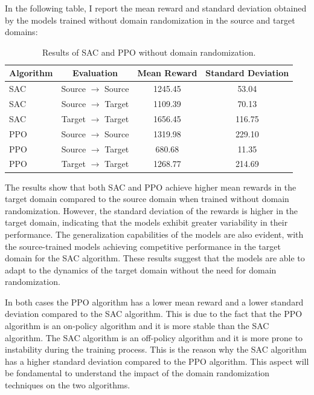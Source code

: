 \documentclass[11pt]{article}
\begin{document}
In the following table, I report the mean reward and standard deviation obtained by the models trained without domain randomization in the source and target domains:

\begin{table}[H]
    \centering
    \begin{tabular}{|l|c|c|c|}
        \hline
        \textbf{Algorithm} & \textbf{Evaluation} & \textbf{Mean Reward} & \textbf{Standard Deviation} \\ \hline
        SAC & Source $\rightarrow$ Source & 1245.45 & 53.04 \\ 
        SAC & Source $\rightarrow$ Target & 1109.39 & 70.13 \\ 
        SAC & Target $\rightarrow$ Target & 1656.45 & 116.75 \\ \hline
        PPO & Source $\rightarrow$ Source & 1319.98 & 229.10 \\ 
        PPO & Source $\rightarrow$ Target & 680.68 & 11.35 \\ 
        PPO & Target $\rightarrow$ Target & 1268.77 & 214.69 \\ \hline
    \end{tabular}
    \caption{Results of SAC and PPO without domain randomization.}
    \label{tab:results_no_randomization}
\end{table}

The results show that both SAC and PPO achieve higher mean rewards in the target domain compared to the source domain when trained without domain randomization. However, the standard deviation of the rewards is higher in the target domain, indicating that the models exhibit greater variability in their performance. The generalization capabilities of the models are also evident, with the source-trained models achieving competitive performance in the target domain for the SAC algorithm. These results suggest that the models are able to adapt to the dynamics of the target domain without the need for domain randomization.

In both cases the PPO algorithm has a lower mean reward and a lower standard deviation compared to the SAC algorithm. This is due to the fact that the PPO algorithm is an on-policy algorithm and it is more stable than the SAC algorithm. The SAC algorithm is an off-policy algorithm and it is more prone to instability during the training process. This is the reason why the SAC algorithm has a higher standard deviation compared to the PPO algorithm. This aspect will be fondamental to understand the impact of the domain randomization techniques on the two algorithms. 
\end{document}
